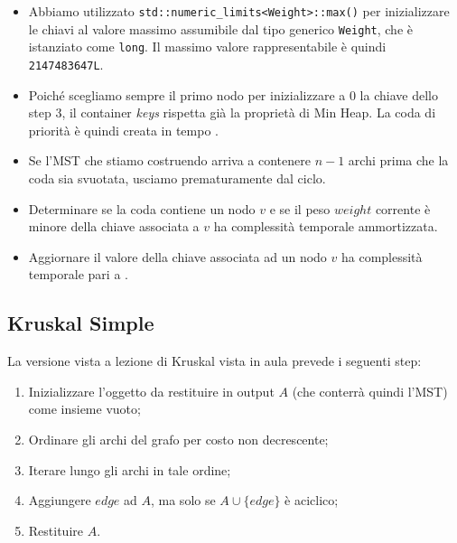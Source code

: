 \begin{itemize}
    \item Abbiamo utilizzato \texttt{std::numeric_limits<Weight>::max()} per inizializzare le chiavi al valore massimo assumibile dal tipo generico \texttt{Weight}, che è istanziato come \texttt{long}. Il massimo valore rappresentabile è quindi \texttt{2147483647L}. \\
    
    \item Poiché scegliamo sempre il primo nodo per inizializzare a 0 la chiave dello step 3, il container \textit{keys} rispetta già la proprietà di Min Heap. La coda di priorità è quindi creata in tempo \complexityConstant{}. \\
    
    \item Se l'MST che stiamo costruendo arriva a contenere $n - 1$ archi prima che la coda sia svuotata, usciamo prematuramente dal ciclo. \\
    
    \item Determinare se la coda contiene un nodo $v$ e se il peso $weight$ corrente è minore della chiave associata a $v$ ha complessità temporale \complexityConstant{} ammortizzata.\\
    
    \item Aggiornare il valore della chiave associata ad un nodo $v$ ha complessità temporale pari a \complexityLogN{}.\\
\end{itemize}


\subsection{Kruskal Simple}

La versione vista a lezione di Kruskal vista in aula prevede i seguenti step:

\begin{enumerate}
    \item Inizializzare l'oggetto da restituire in output $A$ (che conterrà quindi l'MST) come insieme vuoto;
    \item Ordinare gli archi del grafo per costo non decrescente;
    \item Iterare lungo gli archi in tale ordine;
    \item Aggiungere $edge$ ad $A$, ma solo se $A \cup \{ edge \}$ è aciclico;
    \item Restituire $A$.
\end{enumerate}

